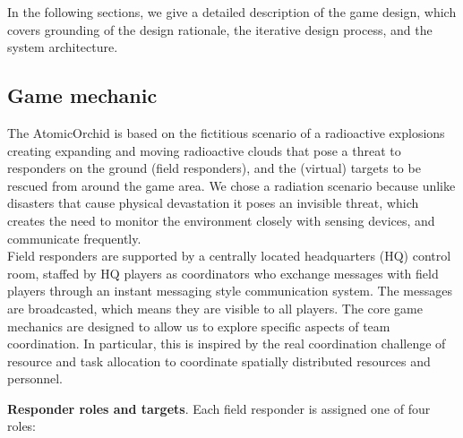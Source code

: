 In the following sections, we give a detailed description of the game design, which covers  grounding of the design rationale, the iterative design process, and the system architecture.

\subsection{Game mechanic} \label{sec:gameRatinale}
The AtomicOrchid is based on the fictitious scenario of a radioactive explosions creating expanding and moving radioactive clouds that pose a threat to responders on the ground (field responders), and the (virtual) targets to be rescued from around the game area. We chose a radiation scenario because unlike disasters that cause physical devastation it poses an invisible threat, which creates the need to monitor the environment closely with sensing devices, and communicate frequently.\\

Field responders are supported by a centrally located headquarters (HQ) control room, staffed by HQ players as coordinators who exchange messages with field players through an instant messaging style communication system. The messages are broadcasted, which means they are visible to all players. The core game mechanics are designed to allow us to explore specific aspects of team coordination. In particular, this is inspired by the real coordination challenge of resource and task allocation to coordinate spatially distributed resources and personnel. 



\textbf{Responder roles and targets}. Each field responder is assigned one of four roles:\\

